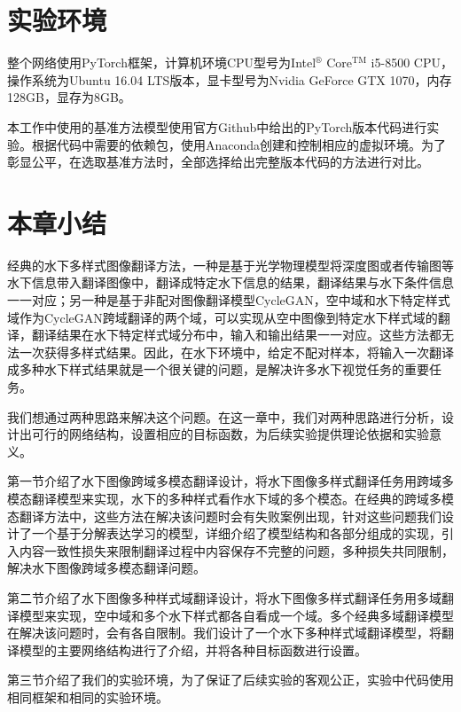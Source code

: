 \section{实验环境}
整个网络使用PyTorch框架，计算机环境CPU型号为Intel$^\circledR$ Core$^{\text{TM}}$ i5-8500 CPU，操作系统为Ubuntu 16.04 LTS版本，显卡型号为Nvidia GeForce GTX 1070，内存128GB，显存为8GB。

本工作中使用的基准方法模型使用官方Github中给出的PyTorch版本代码进行实验。根据代码中需要的依赖包，使用Anaconda创建和控制相应的虚拟环境。为了彰显公平，在选取基准方法时，全部选择给出完整版本代码的方法进行对比。

\section{本章小结}
经典的水下多样式图像翻译方法，一种是基于光学物理模型将深度图或者传输图等水下信息带入翻译图像中，翻译成特定水下信息的结果，翻译结果与水下条件信息一一对应；另一种是基于非配对图像翻译模型CycleGAN，空中域和水下特定样式域作为CycleGAN跨域翻译的两个域，可以实现从空中图像到特定水下样式域的翻译，翻译结果在水下特定样式域分布中，输入和输出结果一一对应。这些方法都无法一次获得多样式结果。因此，在水下环境中，给定不配对样本，将输入一次翻译成多种水下样式结果就是一个很关键的问题，是解决许多水下视觉任务的重要任务。

我们想通过两种思路来解决这个问题。在这一章中，我们对两种思路进行分析，设计出可行的网络结构，设置相应的目标函数，为后续实验提供理论依据和实验意义。

第一节介绍了水下图像跨域多模态翻译设计，将水下图像多样式翻译任务用跨域多模态翻译模型来实现，水下的多种样式看作水下域的多个模态。在经典的跨域多模态翻译方法中，这些方法在解决该问题时会有失败案例出现，针对这些问题我们设计了一个基于分解表达学习的模型，详细介绍了模型结构和各部分组成的实现，引入内容一致性损失来限制翻译过程中内容保存不完整的问题，多种损失共同限制，解决水下图像跨域多模态翻译问题。

第二节介绍了水下图像多种样式域翻译设计，将水下图像多样式翻译任务用多域翻译模型来实现，空中域和多个水下样式都各自看成一个域。多个经典多域翻译模型在解决该问题时，会有各自限制。我们设计了一个水下多种样式域翻译模型，将翻译模型的主要网络结构进行了介绍，并将各种目标函数进行设置。

第三节介绍了我们的实验环境，为了保证了后续实验的客观公正，实验中代码使用相同框架和相同的实验环境。
